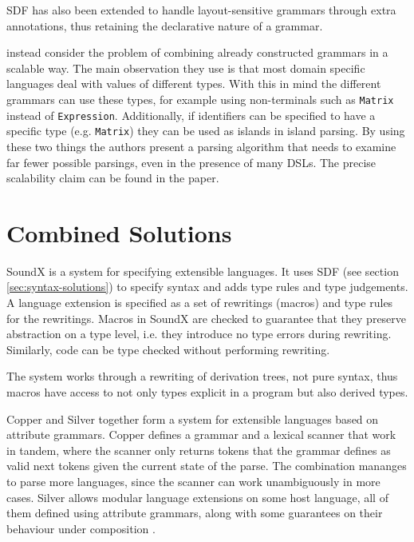 \documentclass{kththesis}
\begin{document}
SDF has also been extended to handle layout-sensitive grammars \cite{Erdweg2013} through extra annotations, thus retaining the declarative nature of a grammar.

\textcite{Silkensen2013} instead consider the problem of combining already constructed grammars in a scalable way. The main observation they use is that most domain specific languages deal with values of different types. With this in mind the different grammars can use these types, for example using non-terminals such as \texttt{Matrix} instead of \texttt{Expression}. Additionally, if identifiers can be specified to have a specific type (e.g. \texttt{Matrix}) they can be used as islands in island parsing. By using these two things the authors present a parsing algorithm that needs to examine far fewer possible parsings, even in the presence of many DSLs. The precise scalability claim can be found in the paper.

\section{Combined Solutions} \label{sec:full-solutions}

SoundX \cite{Lorenzen2016} is a system for specifying extensible languages. It uses SDF (see section \ref{sec:syntax-solutions}) to specify syntax and adds type rules and type judgements. A language extension is specified as a set of rewritings (macros) and type rules for the rewritings. Macros in SoundX are checked to guarantee that they preserve abstraction on a type level, i.e. they introduce no type errors during rewriting. Similarly, code can be type checked without performing rewriting.

The system works through a rewriting of derivation trees, not pure syntax, thus macros have access to not only types explicit in a program but also derived types.

Copper \cite{VanWyk2007} and Silver \cite{VanWyk2010} together form a system for extensible languages based on attribute grammars. Copper defines a grammar and a lexical scanner that work in tandem, where the scanner only returns tokens that the grammar defines as valid next tokens given the current state of the parse. The combination mananges to parse more languages, since the scanner can work unambiguously in more cases. Silver allows modular language extensions on some host language, all of them defined using attribute grammars, along with some guarantees on their behaviour under composition \cite{Kaminski2017}.
\end{document}
